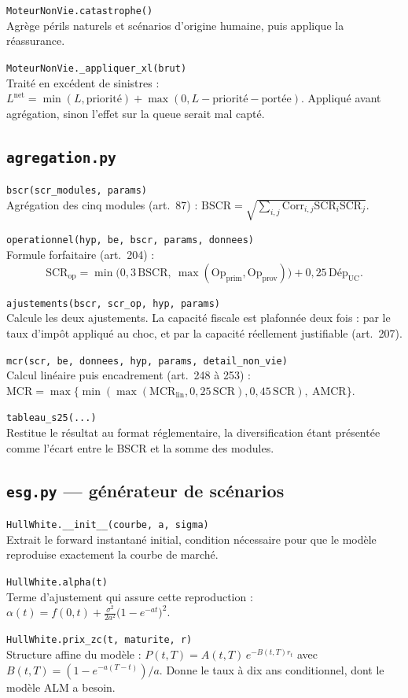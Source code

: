 \documentclass[10pt,a4paper]{article}
\newcommand{\fn}[2]{\par\smallskip\textcolor{bleufonce}{\texttt{#1}}\\ #2\par}
\newcommand{\art}[1]{\textcolor{gris}{\small (art.~#1)}}
\begin{document}
\fn{MoteurNonVie.catastrophe()}{Agrège périls naturels et scénarios d'origine humaine, puis
applique la réassurance.}

\fn{MoteurNonVie.\_appliquer\_xl(brut)}{Traité en excédent de sinistres :
$L^{\text{net}} = \min(L, \text{priorité}) + \max(0, L - \text{priorité} - \text{portée})$.
Appliqué avant agrégation, sinon l'effet sur la queue serait mal capté.}

\subsection{\texttt{agregation.py}}

\fn{bscr(scr\_modules, params)}{Agrégation des cinq modules \art{87} :
$\mathrm{BSCR} = \sqrt{\sum_{i,j}\mathrm{Corr}_{i,j}\mathrm{SCR}_i\mathrm{SCR}_j}$.}

\fn{operationnel(hyp, be, bscr, params, donnees)}{Formule forfaitaire \art{204} :
\[
\mathrm{SCR}_{\text{op}} = \min\bigl(0{,}3\,\mathrm{BSCR},\
\max(\mathrm{Op}_{\text{prim}}, \mathrm{Op}_{\text{prov}})\bigr) + 0{,}25\,\mathrm{Dép}_{\text{UC}} .
\]}

\fn{ajustements(bscr, scr\_op, hyp, params)}{Calcule les deux ajustements. La capacité fiscale
est plafonnée deux fois : par le taux d'impôt appliqué au choc, et par la capacité réellement
justifiable \art{207}.}

\fn{mcr(scr, be, donnees, hyp, params, detail\_non\_vie)}{Calcul linéaire puis encadrement
\art{248 à 253} :
$\mathrm{MCR} = \max\bigl\{\min(\max(\mathrm{MCR}_{\text{lin}}, 0{,}25\,\mathrm{SCR}),
0{,}45\,\mathrm{SCR}),\ \mathrm{AMCR}\bigr\}$.}

\fn{tableau\_s25(...)}{Restitue le résultat au format réglementaire, la diversification étant
présentée comme l'écart entre le BSCR et la somme des modules.}

\subsection{\texttt{esg.py} — générateur de scénarios}

\fn{HullWhite.\_\_init\_\_(courbe, a, sigma)}{Extrait le forward instantané initial, condition
nécessaire pour que le modèle reproduise exactement la courbe de marché.}

\fn{HullWhite.alpha(t)}{Terme d'ajustement qui assure cette reproduction :
$\alpha(t) = f(0,t) + \frac{\sigma^2}{2a^2}\bigl(1-e^{-at}\bigr)^2$.}

\fn{HullWhite.prix\_zc(t, maturite, r)}{Structure affine du modèle :
$P(t,T) = A(t,T)\,e^{-B(t,T)r_t}$ avec $B(t,T) = (1-e^{-a(T-t)})/a$. Donne le taux à dix ans
conditionnel, dont le modèle ALM a besoin.}
\end{document}
